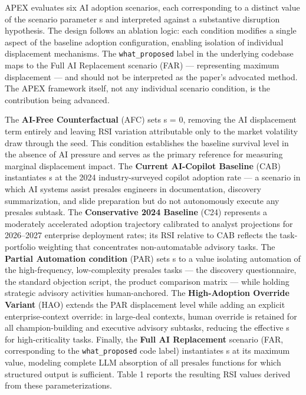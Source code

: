 \documentclass[10pt, conference]{IEEEtran}
\begin{document}
\label{sec:experimental_conditions_and_scenario_par}

APEX evaluates six AI adoption scenarios, each corresponding to a distinct value of the scenario parameter s and interpreted against a substantive disruption hypothesis. The design follows an ablation logic: each condition modifies a single aspect of the baseline adoption configuration, enabling isolation of individual displacement mechanisms. The \texttt{what\_proposed} label in the underlying codebase maps to the Full AI Replacement scenario (FAR) --- representing maximum displacement --- and should not be interpreted as the paper's advocated method. The APEX framework itself, not any individual scenario condition, is the contribution being advanced.

The \textbf{AI-Free Counterfactual} (AFC) sets s = 0, removing the AI displacement term entirely and leaving RSI variation attributable only to the market volatility draw through the seed. This condition establishes the baseline survival level in the absence of AI pressure and serves as the primary reference for measuring marginal displacement impact. The \textbf{Current AI-Copilot Baseline} (CAB) instantiates s at the 2024 industry-surveyed copilot adoption rate --- a scenario in which AI systems assist presales engineers in documentation, discovery summarization, and slide preparation but do not autonomously execute any presales subtask. The \textbf{Conservative 2024 Baseline} (C24) represents a moderately accelerated adoption trajectory calibrated to analyst projections for 2026--2027 enterprise deployment rates; its RSI relative to CAB reflects the task-portfolio weighting that concentrates non-automatable advisory tasks. The \textbf{Partial Automation condition} (PAR) sets s to a value isolating automation of the high-frequency, low-complexity presales tasks --- the discovery questionnaire, the standard objection script, the product comparison matrix --- while holding strategic advisory activities human-anchored. The \textbf{High-Adoption Override Variant} (HAO) extends the PAR displacement level while adding an explicit enterprise-context override: in large-deal contexts, human override is retained for all champion-building and executive advisory subtasks, reducing the effective s for high-criticality tasks. Finally, the \textbf{Full AI Replacement} scenario (FAR, corresponding to the \texttt{what\_proposed} code label) instantiates s at its maximum value, modeling complete LLM absorption of all presales functions for which structured output is sufficient. Table 1 reports the resulting RSI values derived from these parameterizations.
\end{document}
